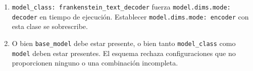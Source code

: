 \begin{enumerate}[nosep]
    \item \texttt{model\_class: frankenstein\_text\_decoder} fuerza \texttt{model.dims.mode: decoder} en tiempo de ejecución. Establecer \texttt{model.dims.mode: encoder} con esta clase se sobrescribe.
    \item O bien \texttt{base\_model} debe estar presente, o bien tanto \texttt{model\_class} como \texttt{model} deben estar presentes. El esquema rechaza configuraciones que no proporcionen ninguno o una combinación incompleta.
\end{enumerate}
